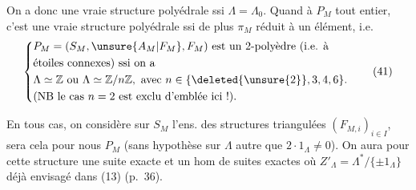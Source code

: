 On a donc une vraie structure polyédrale
 ssi $\Lambda=\Lambda_0$. Quand à $P_M$ tout entier,
c'est une vraie structure polyédrale ssi
 de plus $\pi_M$ réduit à un élément,
i.e.
\[
\left\{\begin{aligned}
&P_M=(S_M,\unsure{A_M|F_M},F_M)\text{ est un }2\text{-polyèdre (i.e. à}\\
&\text{étoiles connexes) ssi on a}\\
&\Lambda\simeq\mathbb Z\text{ ou }\Lambda\simeq\mathbb Z/n\mathbb Z,\ \text{avec }n\in\{\deleted{\unsure{2}},3,4,6\}.\\
&\text{(NB le cas }n=2\text{ est exclu d'emblée ici !)}.
\end{aligned}\right.\tag*{(41)}
\]

En tous cas, on considère sur $S_M$ l'ens.
des structures triangulées $(F_{M,i})_{i\in I}$, 
 sera cela pour nous $P_M$ (sans hypothèse
sur $\Lambda$ autre que $2\cdot1_\Lambda\ne0$). On aura
pour cette structure une suite exacte
et un hom de suites exactes
où $Z'_\Lambda=\Lambda^*/\{\pm1_\Lambda\}$ déjà envisagé dans (13) (p.~36).
